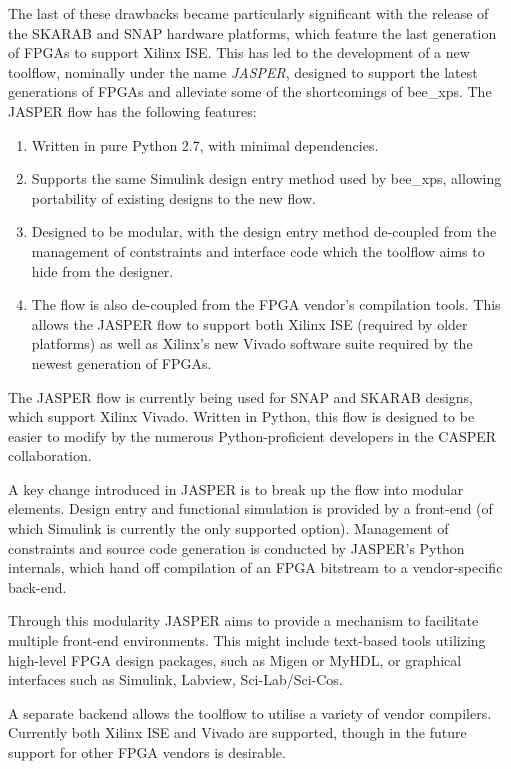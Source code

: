 \documentclass{ws-jai}
\begin{document}
The last of these drawbacks became particularly significant with the release of the SKARAB and SNAP hardware platforms, which feature the last generation of FPGAs to support Xilinx ISE. This has led to the development of a new toolflow, nominally under the name \emph{JASPER}, designed to support the latest generations of FPGAs and alleviate some of the shortcomings of bee\_xps.
The JASPER flow has the following features:
\begin{enumerate}
 \item Written in pure Python 2.7, with minimal dependencies.
 \item Supports the same Simulink design entry method used by bee\_xps, allowing portability of existing designs to the new flow.
 \item Designed to be modular, with the design entry method de-coupled from the management of contstraints and interface code which the toolflow aims to hide from the designer.
 \item The flow is also de-coupled from the FPGA vendor's compilation tools. This allows the JASPER flow to support both Xilinx ISE (required by older platforms) as well as Xilinx's new Vivado software suite required by the newest generation of FPGAs.
\end{enumerate}

The JASPER flow is currently being used for SNAP and SKARAB designs, which support Xilinx Vivado. Written in Python, this flow is designed to be easier to modify by the numerous Python-proficient developers in the CASPER collaboration.

A key change introduced in JASPER is to break up the flow into modular elements. Design entry and functional simulation is provided by a front-end (of which Simulink is currently the only supported option). Management of constraints and source code generation is conducted by JASPER's Python internals, which hand off compilation of an FPGA bitstream to a vendor-specific back-end.
 
Through this modularity JASPER aims to provide a mechanism to facilitate multiple front-end environments. This might include text-based tools utilizing high-level FPGA design packages, such as Migen or MyHDL, or graphical interfaces such as Simulink, Labview, Sci-Lab/Sci-Cos.

A separate backend allows the toolflow to utilise a variety of vendor compilers. Currently both Xilinx ISE and Vivado are supported, though in the future support for other FPGA vendors is desirable.
\end{document}
